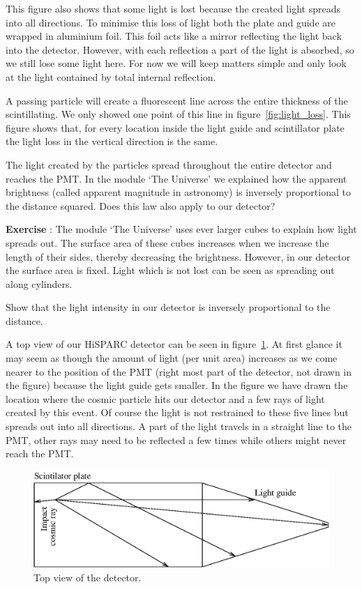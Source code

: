 \documentclass[12pt,a4paper]{article}
\numberwithin{equation}{section}
\numberwithin{figure}{section}
\newcounter{Exercise}
\numberwithin{table}{section}
\begin{document}
This figure also shows that some light is lost because the created light spreads into all directions. To minimise this loss of light both the plate and guide are wrapped in aluminium foil. This foil acts like a mirror reflecting the light back into the detector. However, with each reflection a part of the light is absorbed, so we still lose some light here. For now we will keep matters simple and only look at the light contained by total internal reflection.

A passing particle will create a fluorescent line across the entire thickness of the scintillating. We only showed one point of this line in figure~\ref{fig:light_loss}. This figure shows that, for every location inside the light guide and scintillator plate the light loss in the vertical direction is the same.

The light created by the particles spread throughout the entire detector and reaches the PMT. In the module `The Universe' we explained how the apparent brightness (called apparent magnitude in astronomy) is inversely proportional to the distance squared. Does this law also apply to our detector?

\begin{shaded}
\textbf{Exercise \theExercise {}} : The module `The Universe' uses ever larger cubes to explain how light spreads out. The surface area of these cubes increases when we increase the length of their sides, thereby decreasing the brightness. However, in our detector the surface area is fixed. Light which is not lost can be seen as spreading out along cylinders. 

Show that the light intensity in our detector is inversely proportional to the distance. \end{shaded}

A top view of our HiSPARC detector can be seen in figure~\ref{fig:top_view}. At first glance it may seem as though the amount of light (per unit area) increases as we come nearer to the position of the PMT (right most part of the detector, not drawn in the figure) because the light guide gets smaller. In the figure we have drawn the location where the cosmic particle hits our detector and a few rays of light created by this event. Of course the light is not restrained to these five lines but spreads out into all directions. A part of the light travels in a straight line to the PMT, other rays may need to be reflected a few times while others might never reach the PMT.

\begin{figure}\begin{center}
\includegraphics[scale=1]{top_view.eps}
\caption{Top view of the detector.}\label{fig:top_view}
\end{center}\end{figure}
\end{document}
